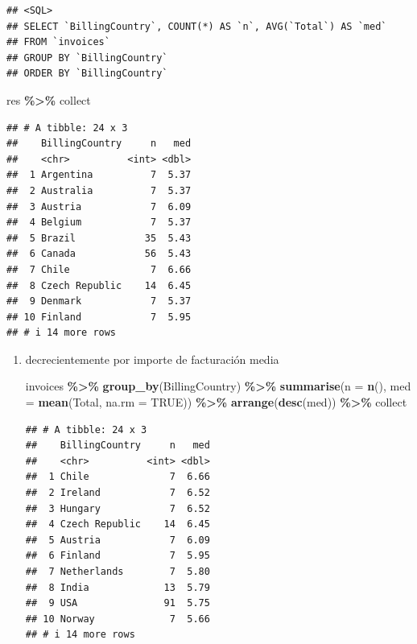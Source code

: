 \documentclass[
]{book}
\newenvironment{Shaded}{\begin{snugshade}}{\end{snugshade}}
\newcommand{\AttributeTok}[1]{\textcolor[rgb]{0.13,0.29,0.53}{#1}}
\newcommand{\ConstantTok}[1]{\textcolor[rgb]{0.56,0.35,0.01}{#1}}
\newcommand{\FunctionTok}[1]{\textcolor[rgb]{0.13,0.29,0.53}{\textbf{#1}}}
\newcommand{\NormalTok}[1]{#1}
\newcommand{\SpecialCharTok}[1]{\textcolor[rgb]{0.81,0.36,0.00}{\textbf{#1}}}
\begin{document}
\begin{enumerate}
\begin{verbatim}
## <SQL>
## SELECT `BillingCountry`, COUNT(*) AS `n`, AVG(`Total`) AS `med`
## FROM `invoices`
## GROUP BY `BillingCountry`
## ORDER BY `BillingCountry`
\end{verbatim}

\begin{Shaded}
\begin{Highlighting}[]
\NormalTok{res  }\SpecialCharTok{\%\textgreater{}\%}\NormalTok{ collect}
\end{Highlighting}
\end{Shaded}

\begin{verbatim}
## # A tibble: 24 x 3
##    BillingCountry     n   med
##    <chr>          <int> <dbl>
##  1 Argentina          7  5.37
##  2 Australia          7  5.37
##  3 Austria            7  6.09
##  4 Belgium            7  5.37
##  5 Brazil            35  5.43
##  6 Canada            56  5.43
##  7 Chile              7  6.66
##  8 Czech Republic    14  6.45
##  9 Denmark            7  5.37
## 10 Finland            7  5.95
## # i 14 more rows
\end{verbatim}
\end{enumerate}

\begin{enumerate}
\def\labelenumi{(\alph{enumi})}
\setcounter{enumi}{1}
\item
  decrecientemente por importe de facturación media

\begin{Shaded}
\begin{Highlighting}[]
\NormalTok{invoices }\SpecialCharTok{\%\textgreater{}\%} \FunctionTok{group\_by}\NormalTok{(BillingCountry) }\SpecialCharTok{\%\textgreater{}\%} 
          \FunctionTok{summarise}\NormalTok{(}\AttributeTok{n =} \FunctionTok{n}\NormalTok{(), }\AttributeTok{med =} \FunctionTok{mean}\NormalTok{(Total, }\AttributeTok{na.rm =} \ConstantTok{TRUE}\NormalTok{)) }\SpecialCharTok{\%\textgreater{}\%}
          \FunctionTok{arrange}\NormalTok{(}\FunctionTok{desc}\NormalTok{(med)) }\SpecialCharTok{\%\textgreater{}\%}\NormalTok{ collect}
\end{Highlighting}
\end{Shaded}

\begin{verbatim}
## # A tibble: 24 x 3
##    BillingCountry     n   med
##    <chr>          <int> <dbl>
##  1 Chile              7  6.66
##  2 Ireland            7  6.52
##  3 Hungary            7  6.52
##  4 Czech Republic    14  6.45
##  5 Austria            7  6.09
##  6 Finland            7  5.95
##  7 Netherlands        7  5.80
##  8 India             13  5.79
##  9 USA               91  5.75
## 10 Norway             7  5.66
## # i 14 more rows
\end{verbatim}
\end{enumerate}
\end{document}
